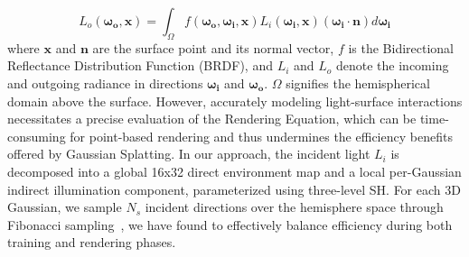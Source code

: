 \begin{equation}
L_{o}(\boldsymbol{\omega_{o}}, \boldsymbol{x}) = \int_{\Omega}f(\boldsymbol{\omega_{o}}, \boldsymbol{\omega_{i}}, \boldsymbol{x})L_{i}(\boldsymbol{\omega_{i}}, \boldsymbol{x})(\boldsymbol{\omega_{i}}\cdot\boldsymbol{n})d\boldsymbol{\omega_{i}}
\label{eq:rendering_equation}
\end{equation}
where $\boldsymbol{x}$ and $\boldsymbol{n}$ are the surface point and its normal vector, $f$ is the Bidirectional Reflectance Distribution Function (BRDF), and $L_{i}$ and $L_{o}$ denote the incoming and outgoing radiance in directions $\boldsymbol{\omega_{i}}$ and $\boldsymbol{\omega_{o}}$. $\Omega$ signifies the hemispherical domain above the surface. However, accurately modeling light-surface interactions necessitates a precise evaluation of the Rendering Equation, which can be time-consuming for point-based rendering and thus undermines the efficiency benefits offered by Gaussian Splatting. In our approach, the incident light $L_i$ is decomposed into a global 16x32 direct environment map and a local per-Gaussian indirect illumination component, parameterized using three-level SH. For each 3D Gaussian, we sample $N_s$ incident directions over the hemisphere space through Fibonacci sampling~\cite{yao2022neilf, gao2023relightable}, we have found to effectively balance efficiency during both training and rendering phases. 


